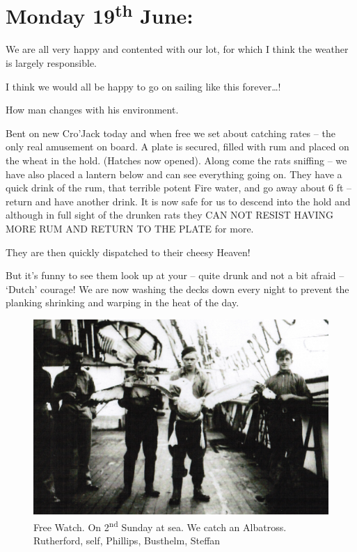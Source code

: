 \documentclass[
  11pt,
  msmallroyalvopaper
]{memoir}
\begin{document}
\hypertarget{monday-19th-june}{%
\section{\texorpdfstring{Monday 19\textsuperscript{th}
June:}{Monday 19th June:}}\label{monday-19th-june}}

We are all very happy and contented with our lot, for which I think the
weather is largely responsible.

I think we would all be happy to go on sailing like this forever\ldots!

How man changes with his environment.

Bent on new Cro'Jack today and when free we set about catching rates --
the only real amusement on board. A plate is secured, filled with rum
and placed on the wheat in the hold. (Hatches now opened). Along come
the rats sniffing -- we have also placed a lantern below and can see
everything going on. They have a quick drink of the rum, that terrible
potent Fire water, and go away about 6 ft -- return and have another
drink. It is now safe for us to descend into the hold and although in
full sight of the drunken rats they CAN NOT RESIST HAVING MORE RUM AND
RETURN TO THE PLATE for more.

They are then quickly dispatched to their cheesy Heaven!

But it's funny to see them look up at your -- quite drunk and not a bit
afraid -- `Dutch' courage! We are now washing the decks down every night
to prevent the planking shrinking and warping in the heat of the day.

\begin{figure}
\centering
\includegraphics{./images/image024.png}
\caption{Free Watch. On 2\textsuperscript{nd} Sunday at sea. We catch an
Albatross. Rutherford, self, Phillips, Busthelm, Steffan}
\end{figure}
\end{document}
